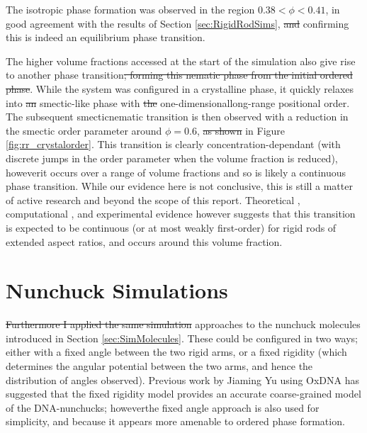 \documentclass[11pt, a4paper]{article} %
\providecommand{\DIFadd}[1]{{\protect\color{blue}\uwave{#1}}} %
\providecommand{\DIFdel}[1]{{\protect\color{red}\sout{#1}}}                      %
\providecommand{\DIFaddbegin}{} %
\providecommand{\DIFaddend}{} %
\providecommand{\DIFdelbegin}{} %
\providecommand{\DIFdelend}{} %
\begin{document}
The isotropic phase formation was observed in the region $0.38 < \phi< 0.41$, in good agreement with the results of Section \ref{sec:RigidRodSims}, \DIFdelbegin \DIFdel{and }\DIFdelend confirming this is indeed an equilibrium phase transition. \DIFdelbegin %

\DIFdelend The higher volume fractions accessed at the start of the simulation also give rise to another phase transition\DIFdelbegin \DIFdel{; forming this nematic phase from the initial ordered phase}\DIFdelend . While the system was configured in a crystalline phase, it quickly relaxes into \DIFdelbegin \DIFdel{an }\DIFdelend \DIFaddbegin \DIFadd{a }\DIFaddend smectic-like phase with \DIFdelbegin \DIFdel{the }\DIFdelend one-dimensional\DIFaddbegin \DIFadd{, }\DIFaddend long-range positional order. The subsequent smectic\textendash nematic transition is then observed with a reduction in the smectic order parameter around $\phi  = 0.6$, \DIFdelbegin \DIFdel{as shown }\DIFdelend \DIFaddbegin \DIFadd{\textcolor{forestgreen}{as shown} }\DIFaddend in Figure \ref{fig:rr_crystalorder}. This transition is clearly concentration-dependant (with discrete jumps in the order parameter when the volume fraction is reduced), however\DIFaddbegin \DIFadd{, }\DIFaddend it occurs over a range of volume fractions and so is likely a continuous phase transition. While our evidence here is not conclusive, this is still a matter of active research and beyond the scope of this report. Theoretical \cite{Wen1987}, computational \cite{Frenkel1988, McGrother1996}, and experimental \cite{Dogic1997, Doane1972} evidence however suggests that this transition is expected to be continuous (or at most weakly first-order) for rigid rods of extended aspect ratios, and occurs around this volume fraction. 

\section{Nunchuck Simulations} \label{sec:Nunchuck_Sim}
\DIFdelbegin \DIFdel{Furthermore I applied the same simulation }\DIFdelend \DIFaddbegin \DIFadd{\textcolor{forestgreen}{Further, I applied applied the same simulation }}\DIFaddend approaches to the nunchuck molecules introduced in Section \ref{sec:SimMolecules}. These could be configured in two ways; either with a fixed angle between the two rigid arms, or a fixed rigidity (which determines the angular potential between the two arms, and hence the distribution of angles observed). Previous work by Jiaming Yu using OxDNA \cite{OxDNA} has suggested that the fixed rigidity model provides an accurate coarse-grained model of the DNA-nunchucks; however\DIFaddbegin \DIFadd{, }\DIFaddend the fixed angle approach is also used for simplicity, and because it appears more amenable to ordered phase formation.
\end{document}
